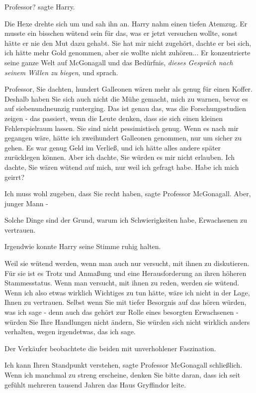 \glqq{}Professor?\grqq{} sagte Harry.

Die Hexe drehte sich um und sah ihn an. Harry nahm einen tiefen Atemzug. Er
musste ein bisschen wütend sein für das, was er jetzt versuchen wollte, sonst
hätte er nie den Mut dazu gehabt. Sie hat mir nicht zugehört, dachte er bei
sich, ich hätte mehr Gold genommen, aber sie wollte nicht zuhören... Er
konzentrierte seine ganze Welt auf McGonagall und das Bedürfnis, \emph{dieses
Gespräch nach seinem Willen zu biegen}, und sprach.

\glqq{}Professor, Sie dachten, hundert Galleonen wären mehr als genug für einen
Koffer. Deshalb haben Sie sich auch nicht die Mühe gemacht, mich zu warnen,
bevor es auf siebenundneunzig runterging. Das ist genau das, was die
Forschungsstudien zeigen - das passiert, wenn die Leute denken, dass sie sich
einen kleinen Fehlerspielraum lassen. Sie sind nicht pessimistisch genug. Wenn
es nach mir gegangen wäre, hätte ich zweihundert Galleonen genommen, nur um
sicher zu gehen. Es war genug Geld im Verließ, und ich hätte alles andere später
zurücklegen können. Aber ich dachte, Sie würden es mir nicht erlauben. Ich
dachte, Sie wären wütend auf mich, nur weil ich gefragt habe. Habe ich mich
geirrt?\grqq{}

\glqq{}Ich muss wohl zugeben, dass Sie recht haben\grqq{}, sagte Professor
McGonagall. \glqq{}Aber, junger Mann -\grqq{}

\glqq{}Solche Dinge sind der Grund, warum ich Schwierigkeiten habe, Erwachsenen
zu vertrauen.\grqq{}

Irgendwie konnte Harry seine Stimme ruhig halten.

\glqq{}Weil sie wütend werden, wenn man auch nur versucht, mit ihnen zu
diskutieren. Für sie ist es Trotz und Anmaßung und eine Herausforderung an ihren
höheren Stammesstatus. Wenn man versucht, mit ihnen zu reden, werden sie wütend.
Wenn ich also etwas wirklich Wichtiges zu tun hätte, wäre ich nicht in der Lage,
Ihnen zu vertrauen. Selbst wenn Sie mit tiefer Besorgnis auf das hören würden,
was ich sage - denn auch das gehört zur Rolle eines besorgten Erwachsenen -
würden Sie Ihre Handlungen nicht ändern, Sie würden sich nicht wirklich anders
verhalten, wegen irgendetwas, das ich sage.\grqq{}

Der Verkäufer beobachtete die beiden mit unverhohlener Faszination.

\glqq{}Ich kann Ihren Standpunkt verstehen\grqq{}, sagte Professor McGonagall
schließlich. \glqq{}Wenn ich manchmal zu streng erscheine, denken Sie bitte
daran, dass ich seit gefühlt mehreren tausend Jahren das Haus Gryffindor
leite.\grqq{}

